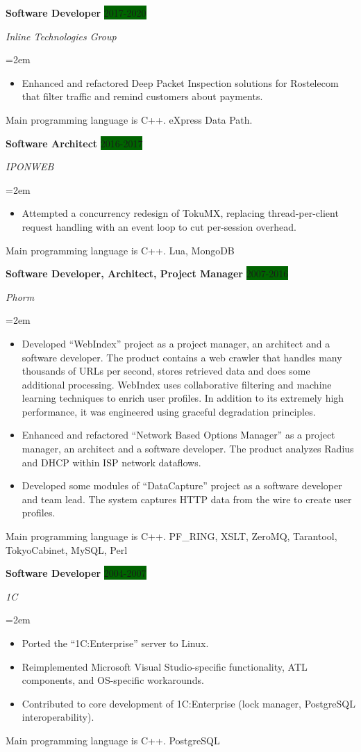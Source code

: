 \documentclass[paper=a4,fontsize=10pt]{scrartcl} %
\newcommand{\sepspace}{\vspace*{1em}}       %
\newcommand{\ProgrammingLanguage}[1]{        %
        Main programming language is #1.}
\newcommand{\EducationEntry}[4]{\pagebreak[2]
        \noindent \textbf{#1} \hfill      %
        \colorbox{DarkGreen}{\color{White}#2} \par  %
        \noindent \textit{#3} \par        %
        \noindent\hangindent=2em\hangafter=0 \small #4 %
        \normalsize \par \sepspace}
\newcommand{\WorkEntry}[4]{\pagebreak[2]    %
        \noindent \textbf{#1} \hfill      %
        \colorbox{DarkGreen}{\color{White}#2} \par  %
        \noindent \textit{#3} \par        %
        \noindent\hangindent=2em\hangafter=0 \small #4 %
        \normalsize \par \sepspace}
\begin{document}
\WorkEntry{Software Developer}{2017-2020}{Inline Technologies Group}{
\begin{itemize}  \itemsep0em
\item  Enhanced and refactored Deep Packet Inspection solutions for Rostelecom that filter traffic and remind customers about payments.
\end{itemize}
\ProgrammingLanguage{C++} eXpress Data Path.
}

\WorkEntry{Software Architect}{2016-2017}{IPONWEB}{
\begin{itemize}  \itemsep0em
\item  Attempted a concurrency redesign of TokuMX, replacing thread-per-client request handling with an event loop to cut per-session overhead.
\end{itemize}
\ProgrammingLanguage{C++} Lua, MongoDB
}

\WorkEntry{Software Developer, Architect, Project Manager}{2007-2016}{Phorm}{
\begin{itemize}  \itemsep0em
\item  Developed ``WebIndex'' project as a project manager, an architect and a software developer. The product contains a web crawler that handles many thousands of URLs per second, stores retrieved data and does some additional processing. WebIndex uses collaborative filtering and machine learning techniques to enrich user profiles. In addition to its extremely high performance, it was engineered using graceful degradation principles.
\item Enhanced and refactored ``Network Based Options Manager'' as a project manager, an architect and a software developer. The product analyzes Radius and DHCP within ISP network dataflows.
\item Developed some modules of ``DataCapture'' project as a software developer and team lead. The system captures HTTP data from the wire to create user profiles.
\end{itemize}
\ProgrammingLanguage{C++} PF\_RING, XSLT, ZeroMQ, Tarantool, TokyoCabinet, MySQL, Perl
}

\WorkEntry{Software Developer}{2004-2007}{1C}{
\begin{itemize}\itemsep0em
\item Ported the ``1C:Enterprise'' server to Linux.
\item Reimplemented Microsoft Visual Studio-specific functionality, ATL components, and OS-specific workarounds.
\item Contributed to core development of 1C:Enterprise (lock manager, PostgreSQL interoperability).
\end{itemize}
\ProgrammingLanguage{C++} PostgreSQL
}
\end{document}
